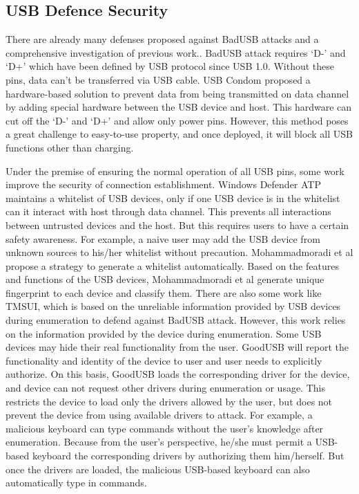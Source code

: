\subsection{USB Defence Security}
\label{subsec:usb_defence}
There are already many defenses proposed against BadUSB attacks and a comprehensive investigation of previous work.\cite{sok}.
BadUSB attack requires `D-' and `D+' which have been defined by USB protocol since USB 1.0\cite{usb10}.
Without these pins, data can't be transferred via USB cable. USB Condom \cite{Condom} proposed a hardware-based solution to prevent data from being transmitted on data channel by adding special hardware between the USB device and host. This hardware can cut off the `D-' and `D+' and allow only power pins.
However, this method poses a great challenge to easy-to-use property, and once deployed, it will block all USB functions other than charging. 

Under the premise of ensuring the normal operation of all USB pins, some work improve the security of connection establishment.
Windows Defender ATP\cite{windenfenderwhite} maintains a whitelist of USB devices, only if one USB device is in the whitelist can it interact with host through data channel. This prevents all interactions between untrusted devices and the host. But this requires users to have a certain safety awareness. For example, a naive user may add the USB device from unknown sources to his/her whitelist without precaution. Mohammadmoradi et al\cite{mohammadmoradi2018making} propose a strategy to generate a whitelist automatically. Based on the features and functions of the USB devices, Mohammadmoradi et al generate unique fingerprint to each device and classify them. There are also some work like TMSUI\cite{yang2015tmsui}, which is based on the unreliable information provided by USB devices during enumeration to defend against BadUSB attack. 
However, this work relies on the information provided by the device during enumeration. Some USB devices may hide their real functionality from the user.
GoodUSB\cite{tian2015defending} will report the functionality and identity of the device to user and user needs to explicitly authorize. On this basis, GoodUSB loads the corresponding driver for the device, and device can not request other drivers during enumeration or usage. This restricts the device to load only the drivers allowed by the user, but does not prevent the device from using available drivers to attack. For example, a malicious keyboard can type commands without the user's knowledge after enumeration. Because from the user's perspective, he/she must permit a USB-based keyboard the corresponding drivers by authorizing them him/herself. But once the drivers are loaded, the malicious USB-based keyboard can also automatically type in commands.

